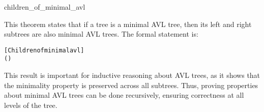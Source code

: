     \begin{thm}{children\_of\_minimal\_avl}

    This theorem states that if a tree is a minimal AVL tree, then its left and right subtrees are also minimal AVL trees. The formal statement is:

    \begin{alltt}
    	[Children of minimal avl]
    	\HOLTokenTurnstile{}  (     ) \HOLSymConst{\HOLTokenImp{}}   \HOLSymConst{\HOLTokenConj{}}  
    \end{alltt}
    
    \end{thm}
    This result is important for inductive reasoning about AVL trees, as it shows that the minimality property is preserved across all subtrees. Thus, proving properties about minimal AVL trees can be done recursively, ensuring correctness at all levels of the tree.

